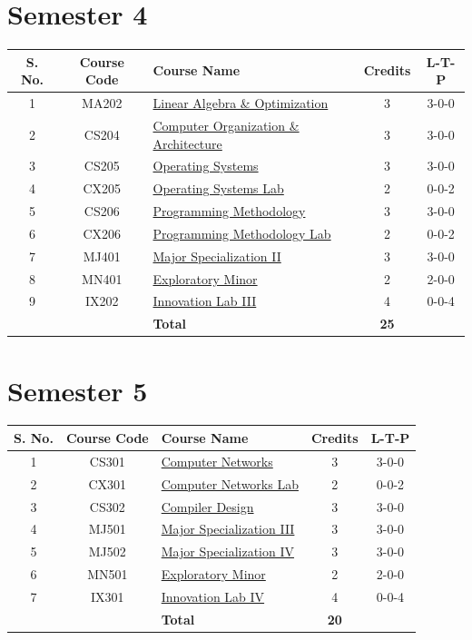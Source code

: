 \section*{Semester 4}
\begin{longtable}{|c|c|p{7cm}|c|c|}
\hline
\textbf{S. No.} & \textbf{Course Code} & \textbf{Course Name} & \textbf{Credits} & \textbf{L-T-P} \\
\hline
1 & MA202 & \hyperref[course:MA202]{Linear Algebra \& Optimization} & 3 & 3-0-0 \\
\hline
2 & CS204 & \hyperref[course:CS204]{Computer Organization \& Architecture} & 3 & 3-0-0 \\
\hline
3 & CS205 & \hyperref[course:CS205]{Operating Systems} & 3 & 3-0-0 \\
\hline
4 & CX205 & \hyperref[course:CX205]{Operating Systems Lab} & 2 & 0-0-2 \\
\hline
5 & CS206 & \hyperref[course:CS206]{Programming Methodology} & 3 & 3-0-0 \\
\hline
6 & CX206 & \hyperref[course:CX206]{Programming Methodology Lab} & 2 & 0-0-2 \\
\hline
7 & MJ401 & \hyperref[table:major2]{Major Specialization II} & 3 & 3-0-0 \\
\hline
8 & MN401 & \hyperref[table:minor_l1]{Exploratory Minor} & 2 & 2-0-0 \\
\hline
9 & IX202 & \hyperref[course:IX202]{Innovation Lab III} & 4 & 0-0-4 \\
\hline
& & \textbf{Total} & \textbf{25} & \\
\hline
\end{longtable}

\newpage

\section*{Semester 5}
\begin{longtable}{|c|c|p{7cm}|c|c|}
\hline
\textbf{S. No.} & \textbf{Course Code} & \textbf{Course Name} & \textbf{Credits} & \textbf{L-T-P} \\
\hline
1 & CS301 & \hyperref[course:CS301]{Computer Networks} & 3 & 3-0-0 \\
\hline
2 & CX301 & \hyperref[course:CX301]{Computer Networks Lab} & 2 & 0-0-2 \\
\hline
3 & CS302 & \hyperref[course:CS302]{Compiler Design} & 3 & 3-0-0 \\
\hline
4 & MJ501 & \hyperref[table:major3]{Major Specialization III} & 3 & 3-0-0 \\
\hline
5 & MJ502 & \hyperref[table:major4]{Major Specialization IV} & 3 & 3-0-0 \\
\hline
6 & MN501 & \hyperref[table:minor_l1]{Exploratory Minor} & 2 & 2-0-0 \\
\hline
7 & IX301 & \hyperref[course:IX301]{Innovation Lab IV} & 4 & 0-0-4 \\
\hline
& & \textbf{Total} & \textbf{20} & \\
\hline
\end{longtable}

